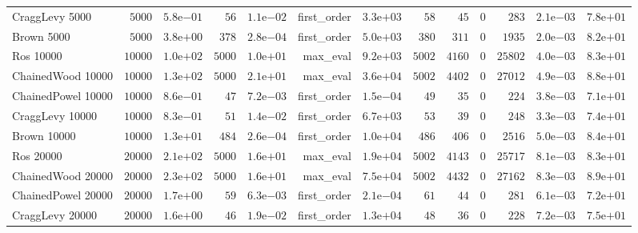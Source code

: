 \begin{longtable}[c]{lrrrrrrrrrrrr}
CraggLevy 5000 & \( 5000\) & \( 5.8\)e\(-01\) & \(   56\) & \( 1.1\)e\(-02\) & first\_order & \( 3.3\)e\(+03\) & \(   58\) & \(   45\) & \(    0\) & \(  283\) & \( 2.1\)e\(-03\) & \( 7.8\)e\(+01\) \\
Brown 5000 & \( 5000\) & \( 3.8\)e\(+00\) & \(  378\) & \( 2.8\)e\(-04\) & first\_order & \( 5.0\)e\(+03\) & \(  380\) & \(  311\) & \(    0\) & \( 1935\) & \( 2.0\)e\(-03\) & \( 8.2\)e\(+01\) \\
Ros 10000 & \(10000\) & \( 1.0\)e\(+02\) & \( 5000\) & \( 1.0\)e\(+01\) & max\_eval & \( 9.2\)e\(+03\) & \( 5002\) & \( 4160\) & \(    0\) & \(25802\) & \( 4.0\)e\(-03\) & \( 8.3\)e\(+01\) \\
ChainedWood 10000 & \(10000\) & \( 1.3\)e\(+02\) & \( 5000\) & \( 2.1\)e\(+01\) & max\_eval & \( 3.6\)e\(+04\) & \( 5002\) & \( 4402\) & \(    0\) & \(27012\) & \( 4.9\)e\(-03\) & \( 8.8\)e\(+01\) \\
ChainedPowel 10000 & \(10000\) & \( 8.6\)e\(-01\) & \(   47\) & \( 7.2\)e\(-03\) & first\_order & \( 1.5\)e\(-04\) & \(   49\) & \(   35\) & \(    0\) & \(  224\) & \( 3.8\)e\(-03\) & \( 7.1\)e\(+01\) \\
CraggLevy 10000 & \(10000\) & \( 8.3\)e\(-01\) & \(   51\) & \( 1.4\)e\(-02\) & first\_order & \( 6.7\)e\(+03\) & \(   53\) & \(   39\) & \(    0\) & \(  248\) & \( 3.3\)e\(-03\) & \( 7.4\)e\(+01\) \\
Brown 10000 & \(10000\) & \( 1.3\)e\(+01\) & \(  484\) & \( 2.6\)e\(-04\) & first\_order & \( 1.0\)e\(+04\) & \(  486\) & \(  406\) & \(    0\) & \( 2516\) & \( 5.0\)e\(-03\) & \( 8.4\)e\(+01\) \\
Ros 20000 & \(20000\) & \( 2.1\)e\(+02\) & \( 5000\) & \( 1.6\)e\(+01\) & max\_eval & \( 1.9\)e\(+04\) & \( 5002\) & \( 4143\) & \(    0\) & \(25717\) & \( 8.1\)e\(-03\) & \( 8.3\)e\(+01\) \\
ChainedWood 20000 & \(20000\) & \( 2.3\)e\(+02\) & \( 5000\) & \( 1.6\)e\(+01\) & max\_eval & \( 7.5\)e\(+04\) & \( 5002\) & \( 4432\) & \(    0\) & \(27162\) & \( 8.3\)e\(-03\) & \( 8.9\)e\(+01\) \\
ChainedPowel 20000 & \(20000\) & \( 1.7\)e\(+00\) & \(   59\) & \( 6.3\)e\(-03\) & first\_order & \( 2.1\)e\(-04\) & \(   61\) & \(   44\) & \(    0\) & \(  281\) & \( 6.1\)e\(-03\) & \( 7.2\)e\(+01\) \\
CraggLevy 20000 & \(20000\) & \( 1.6\)e\(+00\) & \(   46\) & \( 1.9\)e\(-02\) & first\_order & \( 1.3\)e\(+04\) & \(   48\) & \(   36\) & \(    0\) & \(  228\) & \( 7.2\)e\(-03\) & \( 7.5\)e\(+01\) \\

\end{longtable}
